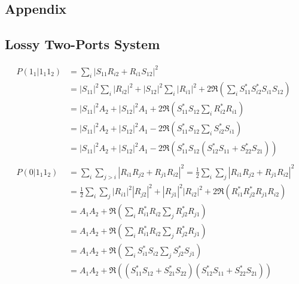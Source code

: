 \documentclass[%
 aps,
 reprint,
 twocolumn,
 amsmath,amssymb,
floatfix,
]{revtex4-2}
\begin{document}

\begin{widetext}
	\section*{Appendix}
	\subsection{Lossy Two-Ports System}
	\begin{align*}
		P(1_1 | 1_1 1_2) & = \sum_i \left| S_{11} R_{i2} + R_{i1} S_{12} \right|^2                                                                       \\
		                 & = |S_{11}|^2 \sum_i |R_{i2}|^2 + |S_{12}|^2  \sum_{i} |R_{i1}|^2 + 2 \Re\left( \sum_i S_{11}^* S_{i2}^* S_{i1} S_{12} \right) \\
		                 & = |S_{11}|^2 A_2 + |S_{12}|^2 A_1 + 2 \Re\left( S_{11}^* S_{12} \sum_i  R_{i2}^* R_{i1} \right)                               \\
		                 & = |S_{11}|^2 A_2 + |S_{12}|^2 A_1 - 2 \Re\left( S_{11}^* S_{12} \sum_i  S_{i2}^* S_{i1} \right)                               \\
		                 & = |S_{11}|^2 A_2 + |S_{12}|^2 A_1 - 2 \Re\left( S_{11}^* S_{12} (S_{12}^* S_{11} + S_{22}^* S_{21}) \right)                   \\
						 \\
		P(0 | 1_1 1_2) & = \sum_i \sum_{j > i} \left| R_{i1} R_{j2} + R_{j1} R_{i2} \right|^2 = \frac{1}{2} \sum_i \sum_j \left| R_{i1} R_{j2} + R_{j1} R_{i2} \right|^2 \\
		               & = \frac{1}{2} \sum_i \sum_j |R_{i1}|^2 |R_{j2}|^2 + |R_{j1}|^2 |R_{i2}|^2 + 2 \Re\left( R_{i1}^* R_{j2}^* R_{j1} R_{i2} \right)                 \\
		               & = A_1A_2 + \Re\left( \sum_i R_{i1}^* R_{i2} \sum_j R_{j2}^* R_{j1}  \right)                                                                     \\
		               & = A_1A_2 + \Re\left( \sum_i R_{i1}^* R_{i2} \sum_j R_{j2}^* R_{j1}  \right)                                                                     \\
		               & = A_1A_2 + \Re\left( \sum_i S_{i1}^* S_{i2} \sum_j S_{j2}^* S_{j1}  \right)                                                                     \\
		               & = A_1A_2 + \Re\left( (S_{11}^* S_{12} + S_{21}^* S_{22}) (S_{12}^* S_{11} + S_{22}^* S_{21})  \right)                                           \\
	\end{align*}
\end{widetext}
\end{document}
